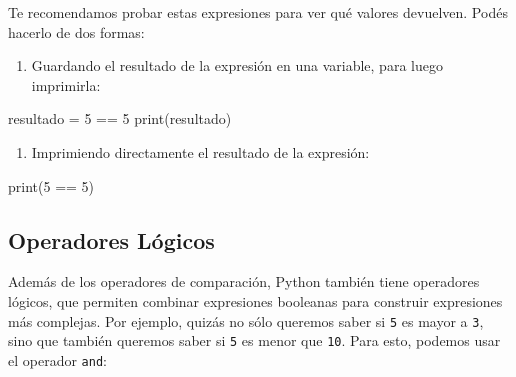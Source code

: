 \documentclass[
  letterpaper,
  DIV=11,
  numbers=noendperiod]{scrreprt}
\newenvironment{Shaded}{\begin{snugshade}}{\end{snugshade}}
\newcommand{\BuiltInTok}[1]{\textcolor[rgb]{0.00,0.23,0.31}{#1}}
\newcommand{\DecValTok}[1]{\textcolor[rgb]{0.68,0.00,0.00}{#1}}
\newcommand{\NormalTok}[1]{\textcolor[rgb]{0.00,0.23,0.31}{#1}}
\newcommand{\OperatorTok}[1]{\textcolor[rgb]{0.37,0.37,0.37}{#1}}
\providecommand{\tightlist}{%
  \setlength{\itemsep}{0pt}\setlength{\parskip}{0pt}}\usepackage{longtable,booktabs,array}
\begin{document}
\begin{tcolorbox}[enhanced jigsaw, bottomrule=.15mm, leftrule=.75mm, opacityback=0, colback=white, toprule=.15mm, bottomtitle=1mm, opacitybacktitle=0.6, rightrule=.15mm, left=2mm, arc=.35mm, coltitle=black, title=\textcolor{quarto-callout-tip-color}{\faLightbulb}\hspace{0.5em}{Tip}, breakable, toptitle=1mm, colframe=quarto-callout-tip-color-frame, titlerule=0mm, colbacktitle=quarto-callout-tip-color!10!white]

Te recomendamos probar estas expresiones para ver qué valores devuelven.
Podés hacerlo de dos formas:

\begin{enumerate}
\def\labelenumi{\arabic{enumi}.}
\tightlist
\item
  Guardando el resultado de la expresión en una variable, para luego
  imprimirla:
\end{enumerate}

\begin{Shaded}
\begin{Highlighting}[]
\NormalTok{resultado }\OperatorTok{=} \DecValTok{5} \OperatorTok{==} \DecValTok{5}
\BuiltInTok{print}\NormalTok{(resultado)}
\end{Highlighting}
\end{Shaded}

\begin{enumerate}
\def\labelenumi{\arabic{enumi}.}
\setcounter{enumi}{1}
\tightlist
\item
  Imprimiendo directamente el resultado de la expresión:
\end{enumerate}

\begin{Shaded}
\begin{Highlighting}[]
\BuiltInTok{print}\NormalTok{(}\DecValTok{5} \OperatorTok{==} \DecValTok{5}\NormalTok{)}
\end{Highlighting}
\end{Shaded}

\end{tcolorbox}

\subsection{Operadores Lógicos}\label{operadores-luxf3gicos}

Además de los operadores de comparación, Python también tiene operadores
lógicos, que permiten combinar expresiones booleanas para construir
expresiones más complejas. Por ejemplo, quizás no sólo queremos saber si
\texttt{5} es mayor a \texttt{3}, sino que también queremos saber si
\texttt{5} es menor que \texttt{10}. Para esto, podemos usar el operador
\texttt{and}:
\end{document}

